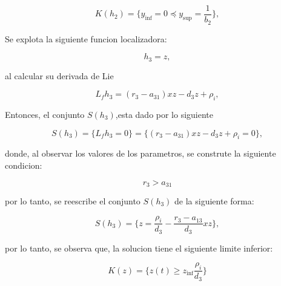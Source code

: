 \documentclass[letterpaper,11pt]{article}
\begin{document}
\begin{equation*}
K\left( h_{2}\right) =\{y_{\inf }=0\preceq y_{\sup }=\frac{1}{b_{2}}\},
\end{equation*}

\bigskip

\bigskip Se explota la siguiente funcion localizadora:

\begin{equation*}
h_{3}=z,
\end{equation*}

\bigskip

al calcular su derivada de Lie

\bigskip

\begin{equation*}
L_{f}h_{3}=\left( r_{3}-a_{31}\right) xz-d_{3}z+\rho _{i},
\end{equation*}

Entonces, el conjunto $S\left( h_{3}\right) $,esta dado por lo siguiente

\bigskip 
\begin{equation*}
S\left( h_{3}\right) =\{L_{f}h_{3}=0\}=\{\left( r_{3}-a_{31}\right)
xz-d_{3}z+\rho _{i}=0\},
\end{equation*}

\bigskip

donde, al observar los valores de los parametros, se construte la siguiente
condicion:

\begin{equation*}
r_{3}>a_{31}
\end{equation*}

\bigskip

por lo tanto, se reescribe el conjunto $S\left( h_{3}\right) $ de la
siguiente forma:

\bigskip

\begin{equation*}
S\left( h_{3}\right) =\{z=\frac{\rho _{i}}{d_{3}}-\frac{r_{3}-a_{13}}{d_{3}}%
xz\},
\end{equation*}

\bigskip

por lo tanto, se observa que, la solucion tiene el siguiente limite inferior:

\bigskip

\begin{equation*}
K\left( z\right) =\{z\left( t\right) \geq z_{\inf }\frac{\rho _{i}}{d_{3}}\}
\end{equation*}

\bigskip
\end{document}
